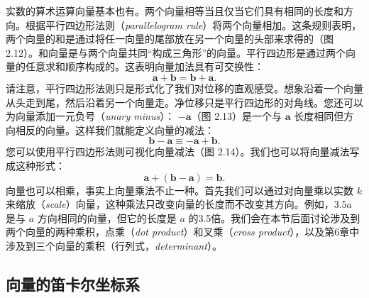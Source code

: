 实数的算术运算向量基本也有。两个向量相等当且仅当它们具有相同的长度和方向。根据平行四边形法则（\textit{parallelogram rule}）将两个向量相加。这条规则表明，两个向量的和是通过将任一向量的尾部放在另一个向量的头部来求得的（图 2.12）。和向量是与两个向量共同“构成三角形”的向量。平行四边形是通过两个向量的任意求和顺序构成的。这表明向量加法具有可交换性：
\[
  \mathbf{a}+\mathbf{b}=\mathbf{b}+\mathbf{a}.
\]
请注意，平行四边形法则只是形式化了我们对位移的直观感受。想象沿着一个向量从头走到尾，然后沿着另一个向量走。净位移只是平行四边形的对角线。您还可以为向量添加一元负号（\textit{unary minus}）： $-\mathbf{a}$（图 2.13）是一个与 $\mathbf{a}$ 长度相同但方向相反的向量。这样我们就能定义向量的减法：
\[
  \mathbf{b}-\mathbf{a} \equiv -\mathbf{a}+\mathbf{b}.
\]
您可以使用平行四边形法则可视化向量减法（图 2.14）。我们也可以将向量减法写成这种形式：
\[
  \mathbf{a}+(\mathbf{b}-\mathbf{a})=\mathbf{b}.
\]
向量也可以相乘，事实上向量乘法不止一种。首先我们可以通过对向量乘以实数 $k$ 来缩放（\textit{scale}）向量，这种乘法只改变向量的长度而不改变其方向。例如，$3.5a$ 是与 $a$ 方向相同的向量，但它的长度是 $a$ 的3.5倍。我们会在本节后面讨论涉及到两个向量的两种乘积，点乘（\textit{dot product}）和叉乘（\textit{cross product}），以及第6章中涉及到三个向量的乘积（行列式，\textit{determinant}）。

\subsection{向量的笛卡尔坐标系}


